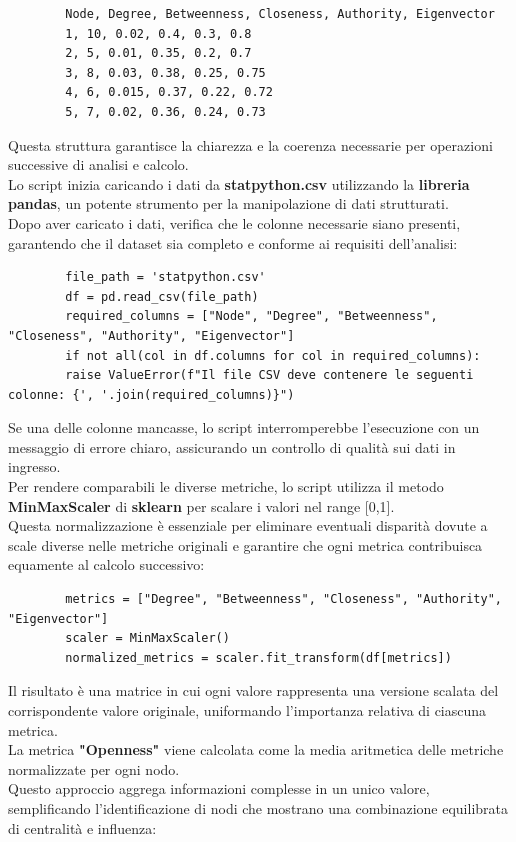 \documentclass[12pt]{article}
\begin{document}
	\begin{lstlisting}
		Node, Degree, Betweenness, Closeness, Authority, Eigenvector
		1, 10, 0.02, 0.4, 0.3, 0.8
		2, 5, 0.01, 0.35, 0.2, 0.7
		3, 8, 0.03, 0.38, 0.25, 0.75
		4, 6, 0.015, 0.37, 0.22, 0.72
		5, 7, 0.02, 0.36, 0.24, 0.73
	\end{lstlisting}
	Questa struttura garantisce la chiarezza e la coerenza necessarie per operazioni successive di analisi e calcolo.\\
	Lo script inizia caricando i dati da \textbf{statpython.csv} utilizzando la \textbf{libreria pandas}, un potente strumento per la manipolazione di dati strutturati.\\ 
	Dopo aver caricato i dati, verifica che le colonne necessarie siano presenti, garantendo che il dataset sia completo e conforme ai requisiti dell'analisi:
	\begin{lstlisting}
		file_path = 'statpython.csv'
		df = pd.read_csv(file_path)
		required_columns = ["Node", "Degree", "Betweenness", "Closeness", "Authority", "Eigenvector"]
		if not all(col in df.columns for col in required_columns):
		raise ValueError(f"Il file CSV deve contenere le seguenti colonne: {', '.join(required_columns)}")
	\end{lstlisting}
	Se una delle colonne mancasse, lo script interromperebbe l'esecuzione con un messaggio di errore chiaro, assicurando un controllo di qualità sui dati in ingresso.\\
	Per rendere comparabili le diverse metriche, lo script utilizza il metodo \textbf{MinMaxScaler} di \textbf{sklearn} per scalare i valori nel range [0,1].\\
	Questa normalizzazione è essenziale per eliminare eventuali disparità dovute a scale diverse nelle metriche originali e garantire che ogni metrica contribuisca equamente al calcolo successivo:
	\begin{lstlisting}
		metrics = ["Degree", "Betweenness", "Closeness", "Authority", "Eigenvector"]
		scaler = MinMaxScaler()
		normalized_metrics = scaler.fit_transform(df[metrics])
	\end{lstlisting}
	Il risultato è una matrice in cui ogni valore rappresenta una versione scalata del corrispondente valore originale, uniformando l'importanza relativa di ciascuna metrica.\\
	La metrica \textbf{"Openness"} viene calcolata come la media aritmetica delle metriche normalizzate per ogni nodo.\\
	Questo approccio aggrega informazioni complesse in un unico valore, semplificando l'identificazione di nodi che mostrano una combinazione equilibrata di centralità e influenza:
\end{document}
